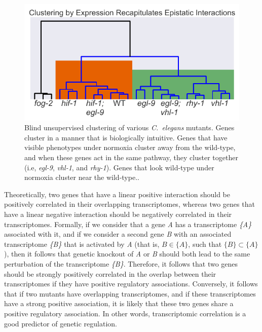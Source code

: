 \documentclass[9pt,twocolumn,twoside]{pnas-new}
\newcommand{\cel}{\emph{C.~elegans}}
\newcommand{\egl}{\emph{egl-9}}
\newcommand{\rhy}{\emph{rhy-1}}
\newcommand{\vhl}{\emph{vhl-1}}
\begin{document}
\begin{figure}%
\centering
\includegraphics[width=.8\linewidth]{figs/dendrogram.pdf}
\caption{Blind unsupervised clustering of various \cel{} mutants. Genes cluster in a manner that is biologically intuitive. Genes that have visible phenotypes under normoxia cluster away from the wild-type, and when these genes act in the same pathway, they cluster together (i.e, \egl{}, \vhl{}, and \rhy{}). Genes that look wild-type under normoxia cluster near the wild-type..}
\label{fig:dendrogram}
\end{figure}

Theoretically, two genes that have a linear positive interaction should be positively correlated in their overlapping transcriptomes, whereas two genes that have a linear negative interaction should be negatively correlated in their transcriptomes. Formally, if we consider that a gene \emph{A} has a transcriptome \emph{\{A\}} associated with it, and if we consider a second gene \emph{B} with an associated transcriptome \emph{\{B\}} that is activated by \emph{A} (that is, $B \in \{A\}$, such that $\{B\} \subset \{A\}$), then it follows that genetic knockout of \emph{A} or \emph{B} should both lead to the same perturbation of the transcriptome \emph{\{B\}}.
Therefore, it follows that two genes should be strongly positively correlated in the overlap between their transcriptomes if they have positive regulatory associations. Conversely, it follows that if two mutants have overlapping transcriptomes, and if these transcriptomes have a strong positive association, it is likely that these two genes share a positive regulatory association. In other words, transcriptomic correlation is a good predictor of genetic regulation.
\end{document}

